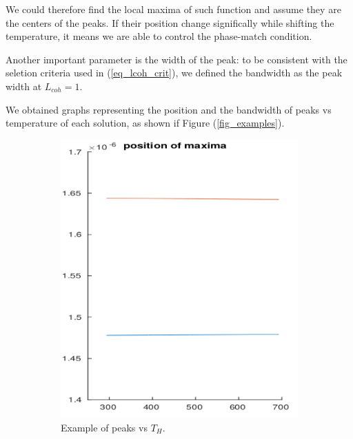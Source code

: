 \documentclass[12pt,a4paper,twoside]{article}
\begin{document}
We could therefore find the local maxima of such function and assume they are the centers of the peaks.
If their position change significally while shifting the temperature, it means we are able to control the phase-match condition.

Another important parameter is the width of the peak: to be consistent with the seletion criteria used in (\ref{eq_lcoh_crit}), we defined the bandwidth as the peak width at $L_{coh} = 1$.

We obtained graphs representing the position and the bandwidth of peaks vs temperature of each solution, as shown if Figure (\ref{fig_examples}).

\begin{figure}[!h]
	\centering
	\begin{subfigure}[b]{0.45\textwidth}
		\includegraphics[width=1\textwidth]{ex_pos.png}
		\caption{Example of peaks vs $T_H$.}
		\label{fig_example_position}
	\end{subfigure}\hspace{.05\textwidth}
	\begin{subfigure}[b]{0.45\textwidth}

\end{subfigure}
\end{figure}
\end{document}

